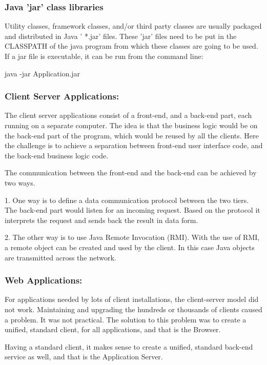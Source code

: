 \documentclass{article}
\begin{document}
\subsubsection{Java 'jar' class libraries}

Utility classes, framework classes, and/or third party classes are usually packaged and distributed in Java ' *.jar' files. These 'jar' files need to be put in the CLASSPATH of the java program from which these classes are going to be used.
If a jar file is executable, it can be run from the command line:

java -jar Application.jar

\subsubsection{Client Server Applications:}

The client server applications consist of a front-end, and a back-end part, each running on a separate computer. The idea is that the business logic would be on the back-end part of the program, which would be reused by all the clients. Here the challenge is to achieve a separation between front-end user interface code, and the back-end business logic code.

The communication between the front-end and the back-end can be achieved by two ways.

1. One way is to define a data communication protocol between the two tiers. The back-end part would listen for an incoming request. Based on the protocol it interprets the request and sends back the result in data form.

2. The other way is to use Java Remote Invocation (RMI). With the use of RMI, a remote object can be created and used by the client. In this case Java objects are transmitted across the network.

\subsubsection{Web Applications:}

For applications needed by lots of client installations, the client-server model did not work. Maintaining and upgrading the hundreds or thousands of clients caused a problem. It was not practical. The solution to this problem was to create a unified, standard client, for all applications, and that is the Browser.

Having a standard client, it makes sense to create a unified, standard back-end service as well, and that is the Application Server.
\end{document}
